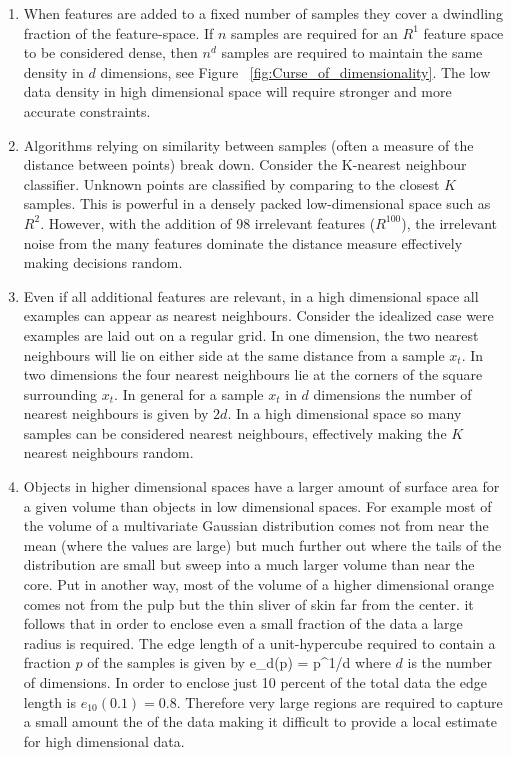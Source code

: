 \begin{enumerate}
\item When features are added to a fixed number of samples they cover a dwindling fraction of the feature-space.
If $n$ samples are required for an $R^1$ feature space to be considered dense, then $n^d$ samples are required to maintain the same density in $d$ dimensions, see Figure ~\ref{fig:Curse_of_dimensionality}.
The low data density in high dimensional space will require stronger and more accurate constraints\citep{cherkassky2007learning}.

\item Algorithms relying on similarity between samples (often a measure of the distance between points) break down.
Consider the K-nearest neighbour classifier. 
Unknown points are classified by comparing to the closest $K$ samples.
This is powerful in a densely packed low-dimensional space such as $R^2$.
However, with the addition of 98 irrelevant features ($R^100$), the irrelevant noise from the many features dominate the distance measure effectively making decisions random.

\item Even if all additional features are relevant, in a high dimensional space all examples can appear as nearest neighbours.
Consider the idealized case were examples are laid out on a regular grid.
In one dimension, the two nearest neighbours will lie on either side at the same distance from a sample $x_t$.
In two dimensions the four nearest neighbours lie at the corners of the square surrounding $x_t$. 
In general for a sample $x_t$ in $d$ dimensions the number of nearest neighbours is given by $2d$. 
In a high dimensional space so many samples can be considered nearest neighbours, effectively making the $K$ nearest neighbours random.


\item Objects in higher dimensional spaces have a larger amount of surface area for a given volume than objects in low dimensional spaces.
For example most of the volume of a multivariate Gaussian distribution comes not from near the mean (where the values are large) but much further out where the tails of the distribution are small but sweep into a much larger volume than near the core.
Put in another way, most of the volume of a higher dimensional orange comes not from the pulp but the thin sliver of skin far from the center.
it follows that in order to enclose even a small fraction of the data a large radius is required\citep{vladimir1998learning}.
The edge length of a unit-hypercube required to contain a fraction $p$ of the samples is given by 
\be
e_d(p) = p^{1/d}
\ee
where $d$ is the number of dimensions.
In order to enclose just 10 percent of the total data the edge length is $e_{10}(0.1) = 0.8$.
Therefore very large regions are required to capture a small amount the of the data making it difficult to provide a local estimate for high dimensional data.


\end{enumerate}
